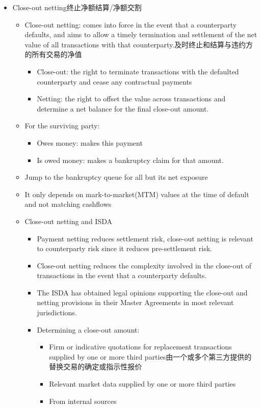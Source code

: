 \begin{itemize}
\item Close-out netting终止净额结算/净额交割
\begin{itemize}
    \item Close-out netting: comes into force in the event that a counterparty defaults, and aims to allow a timely termination and settlement of the net value of all transactions with that counterparty.及时终止和结算与违约方的所有交易的净值
    \begin{itemize}
    \item Close-out: the right to terminate transactions with the defaulted counterparty and cease any contractual payments
    \item Netting: the right to offset the value across transactions and determine a net balance for the final close-out amount.
    \end{itemize}
\item For the surviving party:
\begin{itemize}
    \item Owes money: makes this payment
    \item Is owed money: makes a bankruptcy claim for that amount.
\end{itemize}

\item Jump to the bankruptcy queue for all but its net exposure
\item It only depends on mark-to-market(MTM) values at the time of default and not matching cashflows

\item Close-out netting and ISDA
\begin{itemize}
    \item Payment netting reduces settlement risk, close-out netting is relevant to counterparty risk since it reduces pre-settlement risk.
    \item Close-out netting reduces the complexity involved in the close-out of transactions in the event that a counterparty defaults.
    \item The ISDA has obtained legal opinions supporting the close-out and netting provisions in their Master Agreements in most relevant jurisdictions.
    \item Determining a close-out amount:
    \begin{itemize}
    \item Firm or indicative quotations for replacement transactions supplied by one or more third parties由一个或多个第三方提供的替换交易的确定或指示性报价
    \item Relevant market data supplied by one or more third parties
    \item From internal sources
    \end{itemize}
\end{itemize}


\end{itemize}
\end{itemize}
